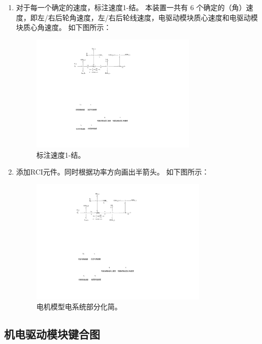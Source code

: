 \begin{enumerate}
	\item 对于每一个确定的速度，标注速度1-结。
	本装置一共有 6 个确定的（角）速度，即左/右后轮角速度，左/右后轮线速度，电驱动模块质心速度和电驱动模块质心角速度。
	如下图所示：
	\begin{figure}[!h]
		\centering
		\includegraphics[width=0.75\textwidth]{fig/4_6_bond.pdf}
		\caption{标注速度1-结。}\label{fig:4_6_bond}
	\end{figure}
	
	\item 添加RCI元件。同时根据功率方向画出半箭头。
	如下图所示：
	\begin{figure}[!h]
		\centering
		\includegraphics[width=0.8\textwidth]{fig/4_6_bond.pdf}
		\caption{电机模型电系统部分化简。}\label{fig:4_7_bond}
	\end{figure}
	
	
\end{enumerate}

\clearpage

\subsection{机电驱动模块键合图}

